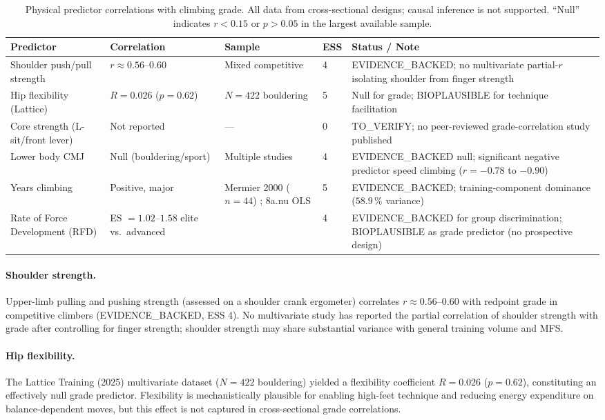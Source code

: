 \begin{table}[ht]
\centering
\caption{Physical predictor correlations with climbing grade. All data from cross-sectional designs; causal inference is not supported. ``Null'' indicates $r < 0.15$ or $p > 0.05$ in the largest available sample.}
\label{tab:physpredictors}
\small
\begin{tabular}{p{3.5cm} p{2.2cm} p{2.5cm} p{2.0cm} p{3.5cm}}
\hline
\textbf{Predictor} & \textbf{Correlation} & \textbf{Sample} & \textbf{ESS} & \textbf{Status / Note} \\
\hline
Shoulder push/pull strength & $r \approx 0.56$--$0.60$ & Mixed competitive & 4 & EVIDENCE\_BACKED; no multivariate partial-$r$ isolating shoulder from finger strength \\[4pt]
Hip flexibility (Lattice) & $R = 0.026$ ($p = 0.62$) & $N = 422$ bouldering & 5 & Null for grade; BIOPLAUSIBLE for technique facilitation \\[4pt]
Core strength (L-sit/front lever) & Not reported & --- & 0 & TO\_VERIFY; no peer-reviewed grade-correlation study published \\[4pt]
Lower body CMJ & Null (bouldering/sport) & Multiple studies & 4 & EVIDENCE\_BACKED null; significant negative predictor speed climbing ($r = -0.78$ to $-0.90$) \\[4pt]
Years climbing & Positive, major & Mermier 2000 ($n=44$) \cite{MJPS00}; 8a.nu OLS & 5 & EVIDENCE\_BACKED; training-component dominance ($58.9\,\%$ variance) \\[4pt]
Rate of Force Development (RFD) & ES $= 1.02$--$1.58$ elite vs.\ advanced & \cite{SVS+21} & 4 & EVIDENCE\_BACKED for group discrimination; BIOPLAUSIBLE as grade predictor (no prospective design) \\
\hline
\end{tabular}
\end{table}

\paragraph{Shoulder strength.}
Upper-limb pulling and pushing strength (assessed on a shoulder crank ergometer) correlates $r \approx 0.56$--$0.60$ with redpoint grade in competitive climbers (EVIDENCE\_BACKED, ESS 4).
No multivariate study has reported the partial correlation of shoulder strength with grade after controlling for finger strength; shoulder strength may share substantial variance with general training volume and MFS.

\paragraph{Hip flexibility.}
The Lattice Training (2025) multivariate dataset ($N = 422$ bouldering) yielded a flexibility coefficient $R = 0.026$ ($p = 0.62$), constituting an effectively null grade predictor.
Flexibility is mechanistically plausible for enabling high-feet technique and reducing energy expenditure on balance-dependent moves, but this effect is not captured in cross-sectional grade correlations.

